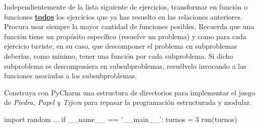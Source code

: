 
\formatoEjecicio




Independientemente de la lista siguiente de ejercicios,  transformar en función o funciones \underline{\bf \large todos} los  ejercicios que ya has resuelto en las relaciones anteriores.  Procura usar siempre la mayor cantidad de funciones posibles. Recuerda que una función tiene un propósito específico (resuelve un problema) y como para cada ejercicio tuviste, en su caso, que descomponer el problema en subproblemas deberías, como mínimo, tener una función por cada subproblema. Si dicho subproblema se descompusiera en subsubproblemas, resuélvelo invocando a las funciones asociadas a los subsubproblemas.
 
 


\begin{ejercicio}
Construya con PyCharm una estructura de directorios para implementar el juego de \textit{Piedra, Papel y Tijera} para repasar la programación estructurada y modular.

\begin{pyverbatim}[][frame=single]
import random
...
if __name__ == '__main__':
    turnos = 3
    run(turnos)
\end{pyverbatim}

\end{ejercicio}

